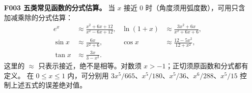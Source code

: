 \textbf{F003 五类常见函数的分式估算。}
当 $x$ 接近 $0$ 时（角度须用弧度数），可用只含加减乘除的分式估算：
\[
\begin{aligned}
e^x&\approx\frac{x^2+6x+12}{x^2-6x+12},&
\ln(1+x)&\approx\frac{3x^2+6x}{x^2+6x+6},\\
\sin x&\approx\frac{6x}{x^2+6},&
\cos x&\approx\frac{12-5x^2}{12+x^2},\\
\tan x&\approx\frac{3x}{3-x^2}.
\end{aligned}
\]
这里的 $\approx$ 只表示接近，绝不是相等。对数须 $x>-1$；正切须原函数和分式都有定义。
在 $0\le x\le1$ 内，可分别用 $3x^5/665$、$x^5/180$、$x^5/36$、$x^6/288$、$x^5/15$ 控制上述五式的误差绝对值。
